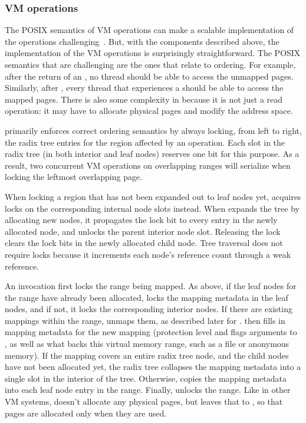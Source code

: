 \subsubsection{VM operations}

The POSIX semantics of VM operations can make a scalable implementation
of the operations challenging~\cite{clements:bonsai}. But, with the
components described above, the \vm implementation of the VM operations is
surprisingly straightforward.  The POSIX semantics that are challenging
are the ones that relate to ordering. For example, after the return
of an , no thread should be able to access the unmapped
pages.  Similarly, after , every thread that experiences a
 should be able to access the mapped pages.  There is
also some
complexity in  because it is not just a read operation:
it may have to allocate physical pages and modify the address space.

\vm primarily enforces correct ordering semantics by always locking,
from left to right, the radix tree entries for the region affected by
an operation.  Each slot in the radix tree (in both interior and leaf
nodes) reserves one bit for this purpose.  As a result, two concurrent
VM operations on overlapping ranges will serialize when locking the
leftmost overlapping page.

When locking a region that has not been expanded out to leaf nodes
yet, \vm acquires locks on the corresponding internal node slots instead.
When \vm expands the tree by allocating new nodes, it propagates the
lock bit to every entry in the newly allocated node, and unlocks the
parent interior node slot.  Releasing the lock clears the lock bits in the
newly allocated child node.  Tree traversal does not require locks
because it increments each node's reference count through a 
weak reference.

An  invocation first locks the range being mapped.  As above,
if the leaf nodes for the range have already been allocated, 
locks the mapping metadata in the leaf nodes, and if not, it locks the
corresponding interior nodes.  If there are existing mappings within the
range,  unmaps them, as described later for .
 then fills in mapping metadata for the new mapping (protection
level and flags arguments to , as well as what backs this virtual
memory range, such as a file or anonymous memory).  If the mapping covers
an entire radix tree node, and the child nodes have not been allocated
yet, the radix tree collapses the mapping metadata into a single slot
in the interior of the tree.
Otherwise, \vm copies the mapping metadata into each leaf node entry in
the range.  Finally, \vm unlocks the range.  Like in other VM systems,
doesn't allocate any physical pages, but leaves that to ,
so that pages are allocated only when they are used.

